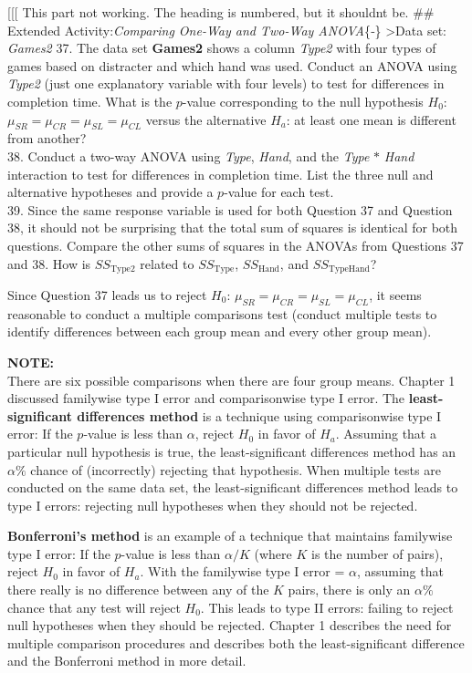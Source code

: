 \documentclass[
]{report}
\begin{document}
{[}{[}{[} This part not working. The heading is numbered, but it shouldnt be.
\#\# Extended Activity:\emph{Comparing One-Way and Two-Way ANOVA}\{‑\}
\textgreater Data set: \emph{Games2}
37. The data set \textbf{Games2} shows a column \emph{Type2} with four types of games based on distracter and which hand was used. Conduct an ANOVA using \emph{Type2} (just one explanatory variable with four levels) to test for differences in completion time. What is the \(p\)-value corresponding to the null hypothesis \(H_0\): \(\mu_{SR} = \mu_{CR} = \mu_{SL} = \mu_{CL}\) versus the alternative \(H_a\): at least one mean is different from another?\\
38. Conduct a two-way ANOVA using \emph{Type}, \emph{Hand}, and the \emph{Type} \(\ast\) \emph{Hand} interaction to test for differences in completion time. List the three null and alternative hypotheses and provide a \(p\)-value for each test.\\
39. Since the same response variable is used for both Question 37 and Question 38, it should not be surprising that the total sum of squares is identical for both questions. Compare the other sums of squares in the ANOVAs from Questions 37 and 38. How is \(SS_{\text{Type2}}\) related to \(SS_{\text{Type}}\), \(SS_{\text{Hand}}\), and \(SS_{\text{TypeHand}}\)?

Since Question 37 leads us to reject \(H_0\): \(\mu_{SR} = \mu_{CR} = \mu_{SL} = \mu_{CL}\), it seems reasonable to conduct a multiple comparisons test (conduct multiple tests to identify differences between each group mean and every other group mean).

\large

\textbf{NOTE:}\\
There are six possible comparisons when there are four group means. Chapter 1 discussed familywise type I error and comparisonwise type I error. The \textbf{least-significant differences method} is a technique using comparisonwise type I error: If the \(p\)-value is less than \(\alpha\), reject \(H_0\) in favor of \(H_a\). Assuming that a particular null hypothesis is true, the least-significant differences method has an \(\alpha\%\) chance of (incorrectly) rejecting that hypothesis. When multiple tests are conducted on the same data set, the least-significant differences method leads to type I errors: rejecting null hypotheses when they should not be rejected.

\textbf{Bonferroni's method} is an example of a technique that maintains familywise type I error: If the \(p\)-value is less than \(\alpha/K\) (where \(K\) is the number of pairs), reject \(H_0\) in favor of \(H_a\). With the familywise type I error = \(\alpha\), assuming that there really is no difference between any of the \(K\) pairs, there is only an \(\alpha\%\) chance that any test will reject \(H_0\). This leads to type II errors: failing to reject null hypotheses when they should be rejected. Chapter 1 describes the need for multiple comparison procedures and describes both the least-significant difference and the Bonferroni method in more detail.
\normalsize
\end{document}
